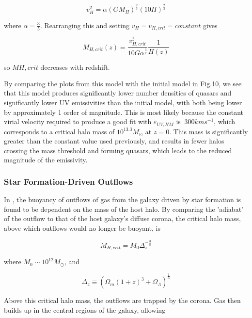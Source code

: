 \documentclass[12pt, twocolumn]{report}%
\begin{document}
\begin{equation}
    v_H^2=\alpha(GM_H)^{\frac{2}{3}}(10H)^{\frac{2}{3}}
\end{equation}

\noindent where $\alpha=\frac{3}{5}$. Rearranging this and setting $v_H=v_{H,crit}=constant$ gives

\begin{equation}
    M_{H,crit}(z)=\frac{v_{H,crit}^3}{10G\alpha^{\frac{3}{2}}}\frac{1}{H(z)}
\end{equation}

\noindent so $M{H,crit}$ decreases with redshift.\par

By comparing the plots from this model with the initial model in Fig.10, we see that this model produces significantly lower number densities of quasars and significantly lower UV emissivities than the initial model, with both being lower by approximately 1 order of magnitude. This is most likely because the constant virial velocity required to produce a good fit with $\varepsilon_{UV,HM}$ is $~300kms^{-1}$, which corresponds to a critical halo mass of $10^{13.3}M_\odot$ at $z=0$. This mass is significantly greater than the constant value used previously, and results in fewer halos crossing the mass threshold and forming quasars, which leads to the reduced magnitude of the emissivity.

\subsubsection{Star Formation-Driven Outflows}

In \cite{Quasar}, the buoyancy of outflows of gas from the galaxy driven by star formation is found to be dependent on the mass of the host halo. By comparing the 'adiabat' of the outflow to that of the host galaxy's diffuse corona, the critical halo mass, above which outflows would no longer be buoyant, is

\begin{equation}
    M_{H,crit}=M_0\Delta_z^{-\frac{3}{8}}
\end{equation}

\noindent where $M_0\sim10^{12}M_\odot$, and

\begin{equation}
    \Delta_z\equiv(\Omega_m(1+z)^3+\Omega_\Lambda)^{\frac{1}{3}}
\end{equation}

\noindent Above this critical halo mass, the outflows are trapped by the corona. Gas then builds up in the central regions of the galaxy, allowing
\end{document}
